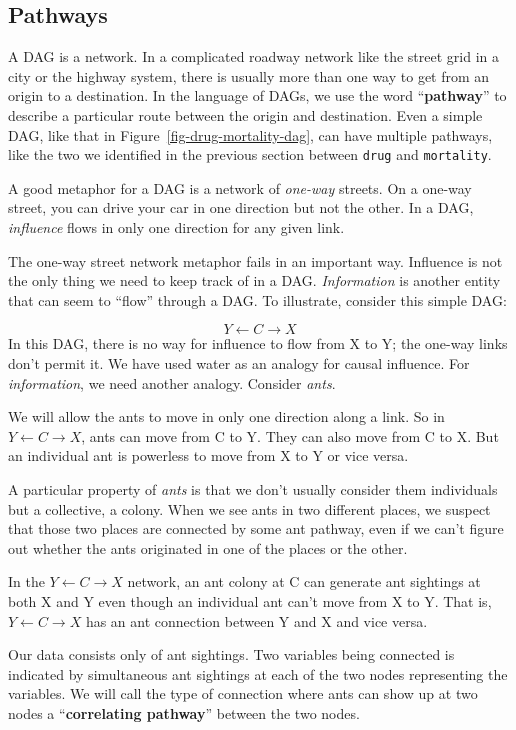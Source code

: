 \documentclass[
  letterpaper,
  DIV=11,
  numbers=noendperiod,
  oneside]{scrartcl}
\begin{document}
\subsection{Pathways}\label{pathways}

A DAG is a network. In a complicated roadway network like the street
grid in a city or the highway system, there is usually more than one way
to get from an origin to a destination. In the language of DAGs, we use
the word ``\textbf{pathway}'' to describe a particular route between the
origin and destination. Even a simple DAG, like that in
Figure~\ref{fig-drug-mortality-dag}, can have multiple pathways, like
the two we identified in the previous section between \texttt{drug} and
\texttt{mortality}.

A good metaphor for a DAG is a network of \emph{one-way} streets. On a
one-way street, you can drive your car in one direction but not the
other. In a DAG, \emph{influence} flows in only one direction for any
given link.

The one-way street network metaphor fails in an important way. Influence
is not the only thing we need to keep track of in a DAG.
\emph{Information} is another entity that can seem to ``flow'' through a
DAG. To illustrate, consider this simple DAG:

\[Y \leftarrow C \rightarrow X\] In this DAG, there is no way for
influence to flow from X to Y; the one-way links don't permit it. We
have used water as an analogy for causal influence. For
\emph{information}, we need another analogy. Consider \emph{ants}.

We will allow the ants to move in only one direction along a link. So in
\(Y \leftarrow C \rightarrow X\), ants can move from C to Y. They can
also move from C to X. But an individual ant is powerless to move from X
to Y or vice versa.

A particular property of \emph{ants} is that we don't usually consider
them individuals but a collective, a colony. When we see ants in two
different places, we suspect that those two places are connected by some
ant pathway, even if we can't figure out whether the ants originated in
one of the places or the other.

In the \(Y \leftarrow C \rightarrow X\) network, an ant colony at C can
generate ant sightings at both X and Y even though an individual ant
can't move from X to Y. That is, \(Y \leftarrow C \rightarrow X\) has an
ant connection between Y and X and vice versa.

Our data consists only of ant sightings. Two variables being connected
is indicated by simultaneous ant sightings at each of the two nodes
representing the variables. We will call the type of connection where
ants can show up at two nodes a ``\textbf{correlating pathway}'' between
the two nodes.
\end{document}
